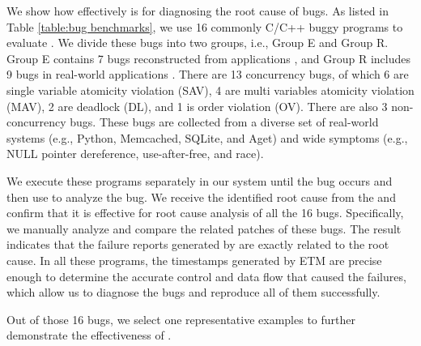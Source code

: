 We show how effectively \TheName is for diagnosing the root cause of bugs. As
listed in Table \ref{table:bug benchmarks}, we use 16 commonly C/C++ buggy
programs
\cite{cui2018rept,kasikci_lazy_2017,yu2009case,yu2012maple,kasikci2015failure, liang2020ript}
to evaluate \TheName.
We divide these bugs into two groups, i.e., Group E and Group R.
Group E contains 7 bugs reconstructed from
applications \cite{yu2009case,yu2012maple}, and Group R includes 9 bugs in
real-world applications
\cite{cui2018rept,kasikci_lazy_2017, kasikci2015failure, liang2020ript}.
There are 13 concurrency bugs, of which 6 are single variable atomicity
violation (SAV), 4 are multi variables atomicity violation (MAV), 2 are deadlock
(DL), and 1 is order violation (OV). There are also 3 non-concurrency bugs.
These bugs are collected from a diverse set of real-world systems (e.g., Python,
Memcached, SQLite, and Aget) and wide symptoms (e.g., NULL pointer dereference,
use-after-free, and race).




We execute these programs separately in our system until the bug occurs
and then use \TheName to analyze the bug. We receive the identified root 
cause from the \TheName and confirm that it is effective for root cause analysis 
of all the 16 bugs. Specifically, we manually analyze and compare the related patches 
of these bugs. The result indicates that the failure reports
generated by \TheName are exactly related to the root cause. In all these programs, 
the timestamps generated by ETM are precise enough to determine the accurate control 
and data flow that caused the failures, which
allow us to diagnose the bugs and reproduce all of them successfully.

Out of those 16 bugs, we select one representative
examples to further demonstrate the effectiveness of \TheName.


